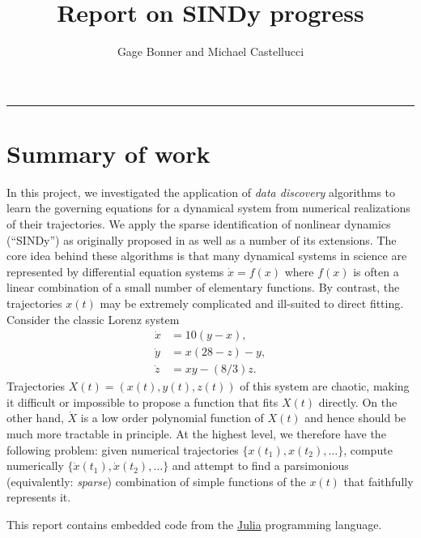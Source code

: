 \documentclass[
]{article}
\title{Report on SINDy progress}
\author{Gage Bonner and Michael Castellucci}
\date{}
\renewcommand*\contentsname{Table of contents}
\newcommand\contentsname{Table of contents}
\begin{document}
\maketitle

\renewcommand*\contentsname{Table of contents}
{
\hypersetup{linkcolor=}
\setcounter{tocdepth}{3}
\tableofcontents
}
\begin{center}\rule{0.5\linewidth}{0.5pt}\end{center}

\section{Summary of work}\label{summary-of-work}

In this project, we investigated the application of \emph{data
discovery} algorithms to learn the governing equations for a dynamical
system from numerical realizations of their trajectories. We apply the
sparse identification of nonlinear dynamics (``SINDy'') as originally
proposed in \cite{brunton2016discovering} as well as a number of its
extensions. The core idea behind these algorithms is that many dynamical
systems in science are represented by differential equation systems
\(\dot{x} = f(x)\) where \(f(x)\) is often a linear combination of a
small number of elementary functions. By contrast, the trajectories
\(x(t)\) may be extremely complicated and ill-suited to direct fitting.
Consider the classic Lorenz system
\begin{subequations} \label{eq:lorenz-def}
\begin{align} 
    \dot{x} &= 10 (y - x), \\
    \dot{y} &= x (28 - z) - y, \\ 
    \dot{z} &= x y - (8 / 3) z .
\end{align}
\end{subequations} Trajectories \(X(t) = (x(t), y(t), z(t))\) of this
system are chaotic, making it difficult or impossible to propose a
function that fits \(X(t)\) directly. On the other hand, \(\dot{X}\) is
a low order polynomial function of \(X(t)\) and hence should be much
more tractable in principle. At the highest level, we therefore have the
following problem: given numerical trajectories
\(\{x(t_1), x(t_2), \dots \}\), compute numerically
\(\{\dot{x}(t_1), \dot{x}(t_2), \dots \}\) and attempt to find a
parsimonious (equivalently: \emph{sparse}) combination of simple
functions of the \(x(t)\) that faithfully represents it.

This report contains embedded code from the
\href{https://julialang.org/}{Julia} programming language.
\end{document}
